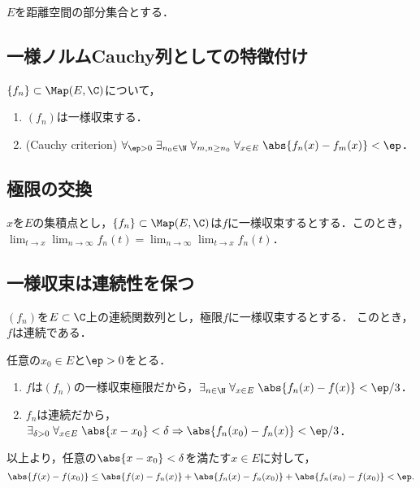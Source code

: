 \documentclass[uplatex, dvipdfmx]{jsreport}
\begin{document}
\begin{notation}
    $E$を距離空間の部分集合とする．
\end{notation}

\subsection{一様ノルムCauchy列としての特徴付け}

\begin{proposition}[一様収束の判定法]
    $\{f_n\}\subset\Map(E,\C)$について，
    \begin{enumerate}
        \item $(f_n)$は一様収束する．
        \item (Cauchy criterion) $\forall_{\ep>0}\;\exists_{n_0\in\N}\;\forall_{m,n\ge n_0}\;\forall_{x\in E}\;\abs{f_n(x)-f_m(x)}<\ep$．
    \end{enumerate}
\end{proposition}

\subsection{極限の交換}

\begin{theorem}
    $x$を$E$の集積点とし，$\{f_n\}\subset\Map(E,\C)$は$f$に一様収束するとする．このとき，$\lim_{t\to x}\lim_{n\to\infty}f_n(t)=\lim_{n\to\infty}\lim_{t\to x}f_n(t)$．
\end{theorem}

\subsection{一様収束は連続性を保つ}


\begin{corollary}[一様収束は連続性を保つ]
    $(f_n)$を$E\subset\C$上の連続関数列とし，極限$f$に一様収束するとする．
    このとき，$f$は連続である．
\end{corollary}
\begin{Proof}
    任意の$x_0\in E$と$\ep>0$をとる．
    \begin{enumerate}
        \item $f$は$(f_n)$の一様収束極限だから，$\exists_{n\in\N}\;\forall_{x\in E}\;\abs{f_n(x)-f(x)}<\ep/3$．
        \item $f_n$は連続だから，$\exists_{\delta>0}\;\forall_{x\in E}\;\abs{x-x_0}<\delta\Rightarrow\abs{f_n(x_0)-f_n(x)}<\ep/3$．
    \end{enumerate}
    以上より，任意の$\abs{x-x_0}<\delta$を満たす$x\in E$に対して，
    \[\abs{f(x)-f(x_0)}\le\abs{f(x)-f_n(x)}+\abs{f_n(x)-f_n(x_0)}+\abs{f_n(x_0)-f(x_0)}<\ep.\]
\end{Proof}
\end{document}
